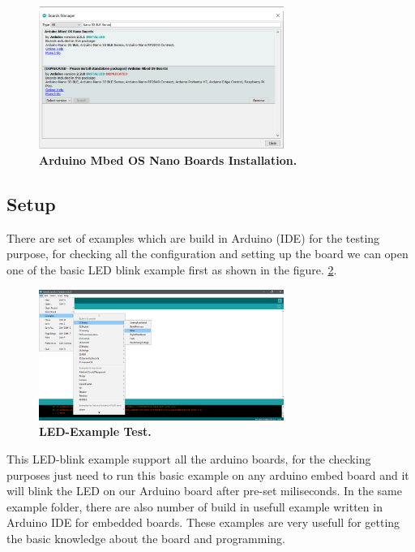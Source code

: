 \begin{figure}[h]\centering
	\includegraphics[width=8cm]{Images/SoftwareDescription/Arduino Mbed OS Nano Boards Installation}
	\caption{\textbf{Arduino Mbed OS Nano Boards Installation.}}
	\label{fig:Arduino Mbed OS Nano Boards Installation}		
\end{figure}



\subsection{Setup}
There are set of examples which are build in Arduino (IDE) for the testing purpose, for checking all the configuration and setting up the board we can open one of the basic LED blink example first as shown in the figure.  \ref{fig:LED-Example Test}.



\begin{figure}[h]\centering
	\includegraphics[width=8cm]{Images/SoftwareDescription/Menu bar options}
	\caption{\textbf{LED-Example Test.}}
	\label{fig:LED-Example Test}		
\end{figure}
This LED-blink example support all the arduino boards, for the checking purposes just need to run this basic example on any arduino embed board and it will blink the LED on our Arduino board after pre-set miliseconds. In the same example folder, there are also number of build in usefull example written in Arduino IDE for embedded boards. These examples are very usefull for getting the basic knowledge about the board and programming.

